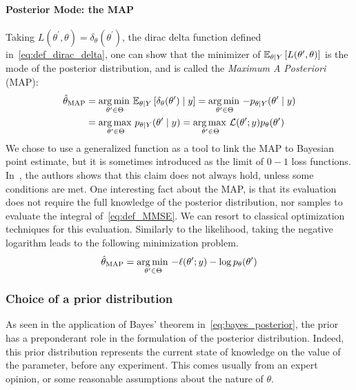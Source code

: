 \documentclass[../../Main_ManuscritThese.tex]{subfiles}
\begin{document}
\paragraph{Posterior Mode: the MAP}
Taking $L(\theta^{\prime},\theta) = \delta_{\theta}(\theta^{\prime})$, the dirac delta function defined in~\cref{eq:def_dirac_delta}, one can show that the minimizer of $\mathbb{E}_{\theta\mid Y}\left[L(\theta^{\prime},\theta)\right]$ is the mode of the posterior distribution, and is called the \emph{Maximum A Posteriori} (MAP):
\begin{align}
  \label{eq:def_MAP}
  \hat{\theta}_{\mathrm{MAP}} &= \operatorname*{arg\,min \,}_{\theta^{\prime} \in \Theta}\mathbb{E}_{\theta\mid Y}\left[\delta_{\theta}(\theta^{\prime})\mid y\right] = \operatorname*{arg\,min \,}_{\theta^{\prime} \in \Theta} -p_{\theta\mid Y}(\theta^{\prime}\mid y) \\
                         &= \operatorname*{arg\,max \,}_{\theta^{\prime} \in \Theta} p_{\theta\mid Y}(\theta^{\prime} \mid y) = \operatorname*{arg\,max \,}_{\theta^{\prime} \in \Theta} \mathcal{L}(\theta^{\prime} ;y)p_{\theta}(\theta^{\prime})
                           \nonumber
\end{align}
We chose to use a generalized function as a tool to link the MAP to Bayesian point estimate, but it is sometimes introduced as the limit of $0-1$ loss functions. In~\cite{bassett_maximum_2019}, the authors shows that this claim does not always hold, unless some conditions are met.
One interesting fact about the MAP, is that its evaluation does not require the full knowledge of the posterior distribution, nor samples to evaluate the integral of~\cref{eq:def_MMSE}. We can resort to classical optimization techniques for this evaluation. Similarly to the likelihood, taking the negative logarithm leads to the following minimization problem.
\begin{equation}
  \label{eq:minimisation_MAP_log}
  \hat{\theta}_{\mathrm{MAP}} = \operatorname*{arg\,min \,}_{\theta^{\prime}\in \Theta} -\ell(\theta^{\prime};y) - \log p_{\theta}(\theta^{\prime})
\end{equation}

\subsubsection{Choice of a prior distribution}
\label{sec:choice_prior}
As seen in the application of Bayes' theorem in~\cref{eq:bayes_posterior}, the prior has a preponderant role in the formulation of the posterior distribution. Indeed, this prior distribution represents the current state of knowledge on the value of the parameter, before any experiment. This comes usually from an expert opinion, or some reasonable assumptions about the nature of $\theta$.
\end{document}
